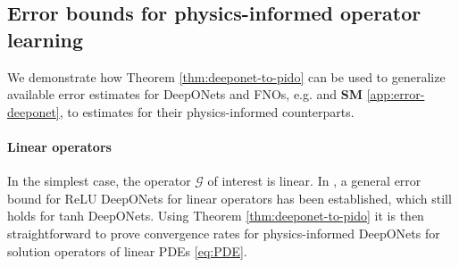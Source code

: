 \documentclass{article}
\numberwithin{equation}{section}
\newcommand{\R}{\mathbb{R}}
\newcommand{\cG}{\mathcal{G}}
\newcommand{\1}{\mathbbm{1}}
\begin{document}




\subsection{Error bounds for physics-informed operator learning}\label{sec:PIDO}

We demonstrate how Theorem \ref{thm:deeponet-to-pido} can be used to generalize available error estimates for DeepONets and FNOs, e.g. \cite{LMK1, kovachki2021universal} and \textbf{SM} \ref{app:error-deeponet}, to estimates for their physics-informed counterparts. 

\paragraph{Linear operators} In the simplest case, the operator $\cG$ of interest is linear. In \cite[Theorem D.2]{LMK1}, a general error bound for ReLU DeepONets for linear operators has been established, which still holds for tanh DeepONets. Using Theorem \ref{thm:deeponet-to-pido} it is then straightforward to prove convergence rates for physics-informed DeepONets for 
solution operators of linear PDEs \eqref{eq:PDE}. 
\end{document}
